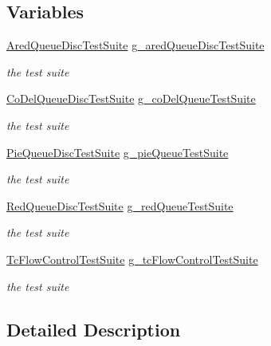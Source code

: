 \subsection*{Variables}
\begin{DoxyCompactItemize}
\item 
\hyperlink{classAredQueueDiscTestSuite}{Ared\+Queue\+Disc\+Test\+Suite} \hyperlink{group__traffic-control-test_gaff3ce56f453bf048d86ed920d4ef289b}{g\+\_\+ared\+Queue\+Disc\+Test\+Suite}
\begin{DoxyCompactList}\small\item\em the test suite \end{DoxyCompactList}\item 
\hyperlink{classCoDelQueueDiscTestSuite}{Co\+Del\+Queue\+Disc\+Test\+Suite} \hyperlink{group__traffic-control-test_gafcd415bd70772eea582f283383c885ba}{g\+\_\+co\+Del\+Queue\+Test\+Suite}
\begin{DoxyCompactList}\small\item\em the test suite \end{DoxyCompactList}\item 
\hyperlink{classPieQueueDiscTestSuite}{Pie\+Queue\+Disc\+Test\+Suite} \hyperlink{group__traffic-control-test_gaf853e0088fe05fab37addc1bd93bf24a}{g\+\_\+pie\+Queue\+Test\+Suite}
\begin{DoxyCompactList}\small\item\em the test suite \end{DoxyCompactList}\item 
\hyperlink{classRedQueueDiscTestSuite}{Red\+Queue\+Disc\+Test\+Suite} \hyperlink{group__traffic-control-test_ga6d67a0d8c95097fe204536a2f38f96b3}{g\+\_\+red\+Queue\+Test\+Suite}
\begin{DoxyCompactList}\small\item\em the test suite \end{DoxyCompactList}\item 
\hyperlink{classTcFlowControlTestSuite}{Tc\+Flow\+Control\+Test\+Suite} \hyperlink{group__traffic-control-test_ga8763012d5b6697cbfb3b26738cf3f884}{g\+\_\+tc\+Flow\+Control\+Test\+Suite}
\begin{DoxyCompactList}\small\item\em the test suite \end{DoxyCompactList}\end{DoxyCompactItemize}


\subsection{Detailed Description}


